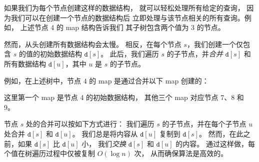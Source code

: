 如果我们为每个节点创建这样的数据结构，
就可以轻松处理所有给定的查询，
因为我们可以在创建一个节点的数据结构后
立即处理与该节点相关的所有查询。例如，
上述节点 4 的 map 结构告诉我们
其子树包含两个值为 3 的节点。

然而，从头创建所有数据结构会太慢。
相反，在每个节点 $s$，我们创建一个仅包含 $s$ 的值的初始数据结构 $\texttt{d}[s]$。
此后，我们遍历 $s$ 的子节点，并\emph{合并} $\texttt{d}[s]$ 和所有数据结构 $\texttt{d}[u]$，其中 $u$ 是 $s$ 的子节点。

例如，在上述树中，节点 $4$ 的 map 是通过合并以下 map 创建的：

\begin{center}
\end{center}

这里第一个 map 是节点 4 的初始数据结构，
其他三个 map 对应节点 7、8 和 9。

节点 $s$ 处的合并可以按如下方式进行：
我们遍历 $s$ 的子节点，并在每个子节点 $u$ 处合并 $\texttt{d}[s]$ 和 $\texttt{d}[u]$。
我们总是将内容从 $\texttt{d}[u]$ 复制到 $\texttt{d}[s]$。
然而，在此之前，如果 $\texttt{d}[s]$ 比 $\texttt{d}[u]$ 小，
我们\emph{交换} $\texttt{d}[s]$ 和 $\texttt{d}[u]$ 的内容。
通过这样做，每个值在树遍历过程中仅被复制 $O(\log n)$ 次，
从而确保算法是高效的。

